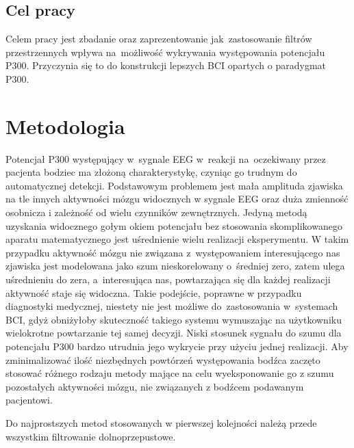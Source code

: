 \documentclass[licencjacka,openright]{pracamgr}
\begin{document}
\section{Cel pracy}

Celem pracy jest zbadanie oraz zaprezentowanie jak~zastosowanie filtrów przestrzennych wpływa na~możliwość wykrywania występowania potencjału P300. Przyczynia się to do konstrukcji lepszych BCI opartych o paradygmat P300.

\chapter{Metodologia}
Potencjał P300 występujący w~sygnale EEG w~reakcji na~oczekiwany przez pacjenta bodziec ma złożoną charakterystykę, czyniąc go trudnym do automatycznej detekcji. Podstawowym problemem jest mała amplituda zjawiska na tle innych aktywności mózgu widocznych w sygnale EEG oraz duża zmienność osobnicza i zależność od wielu czynników zewnętrznych. 
Jedyną metodą uzyskania widocznego gołym okiem potencjału bez stosowania skomplikowanego aparatu matematycznego jest uśrednienie wielu realizacji eksperymentu. W takim przypadku aktywność mózgu nie związana z~występowaniem interesującego nas zjawiska jest modelowana jako szum nieskorelowany o~średniej zero, zatem ulega uśrednieniu do zera, a~interesująca nas, powtarzająca się dla każdej realizacji aktywność staje się widoczna. Takie podejście, poprawne w przypadku diagnostyki medycznej, niestety nie jest możliwe do~zastosowania w~systemach BCI, gdyż obniżyłoby skuteczność takiego systemu wymuszając na użytkowniku wielokrotne powtarzanie tej samej decyzji. Niski stosunek sygnału do szumu dla potencjału P300 bardzo utrudnia jego wykrycie przy użyciu jednej realizacji. Aby zminimalizować ilość niezbędnych powtórzeń występowania bodźca zaczęto stosować różnego rodzaju metody mające na celu wyeksponowanie go z szumu pozostałych aktywności mózgu, nie związanych z bodźcem podawanym pacjentowi.

Do najprostszych metod stosowanych w pierwszej kolejności należą przede wszystkim filtrowanie dolnoprzepustowe. 
\end{document}
